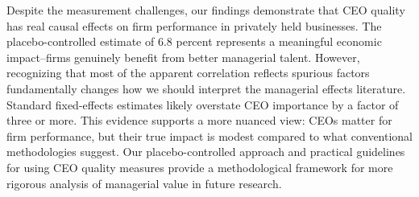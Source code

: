 \documentclass[11pt,a4paper]{article}
\begin{document}
Despite the measurement challenges, our findings demonstrate that CEO quality has real causal effects on firm performance in privately held businesses. The placebo-controlled estimate of 6.8 percent represents a meaningful economic impact\---firms genuinely benefit from better managerial talent. However, recognizing that most of the apparent correlation reflects spurious factors fundamentally changes how we should interpret the managerial effects literature. Standard fixed-effects estimates likely overstate CEO importance by a factor of three or more. This evidence supports a more nuanced view: CEOs matter for firm performance, but their true impact is modest compared to what conventional methodologies suggest. Our placebo-controlled approach and practical guidelines for using CEO quality measures provide a methodological framework for more rigorous analysis of managerial value in future research.
\end{document}
